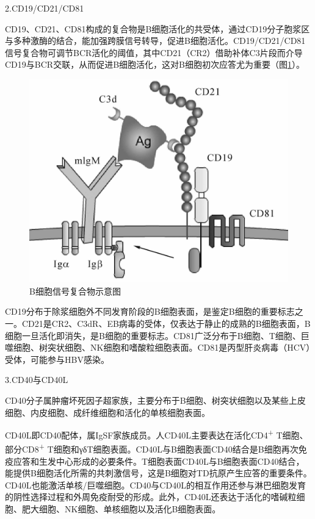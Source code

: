 2.CD19/CD21/CD81

CD19、CD21、CD81构成的复合物是B细胞活化的共受体，通过CD19分子胞浆区与多种激酶的结合，能加强跨膜信号转导，促进B细胞活化。CD19/CD21/CD81信号复合物可调节BCR活化的阈值，其中CD21（CR2）借助补体C3片段而介导CD19与BCR交联，从而促进B细胞活化，这对B细胞初次应答尤为重要（图\ref{fig8-6}）。

\begin{figure}[!htbp]
 \centering
 \includegraphics{./images/Image00116.jpg}
 \captionsetup{justification=centering}
 \caption{B细胞信号复合物示意图}
 \label{fig8-6}
  \end{figure} 

CD19分布于除浆细胞外不同发育阶段的B细胞表面，是鉴定B细胞的重要标志之一。CD21是CR2、C3dR、EB病毒的受体，仅表达于静止的成熟的B细胞表面，B细胞一旦活化即消失，是B细胞的重要标志。CD81广泛分布于B细胞、T细胞、巨噬细胞、树突状细胞、NK细胞和嗜酸粒细胞表面。CD81是丙型肝炎病毒（HCV）受体，可能参与HBV感染。

3.CD40与CD40L

CD40分子属肿瘤坏死因子超家族，主要分布于B细胞、树突状细胞以及某些上皮细胞、内皮细胞、成纤维细胞和活化的单核细胞表面。

CD40L即CD40配体，属IgSF家族成员。人CD40L主要表达在活化CD4\textsuperscript{+}
T细胞、部分CD8\textsuperscript{+}
T细胞和γδT细胞表面。CD40L与B细胞表面CD40结合是B细胞再次免疫应答和生发中心形成的必要条件。T细胞表面CD40L与B细胞表面CD40结合，能提供B细胞活化所需的共刺激信号，这是B细胞对TD抗原产生应答的重要条件。CD40L也能激活单核/巨噬细胞。CD40与CD40L的相互作用还参与淋巴细胞发育的阴性选择过程和外周免疫耐受的形成。此外，CD40L还表达于活化的嗜碱粒细胞、肥大细胞、NK细胞、单核细胞以及活化B细胞表面。

